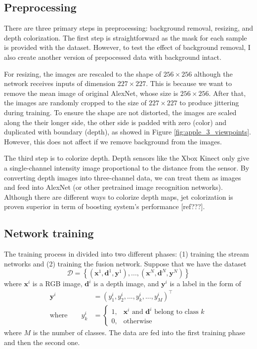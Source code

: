 \subsection{Preprocessing}\label{subsec:preprocessing}
There are three primary steps in preprocessing: background removal, resizing, and depth colorization. The first step is straightforward as the mask for each sample is provided with the dataset. However, to test the effect of background removal, I also create another version of prepocessed data with background intact. 

For resizing, the images are rescaled to the shape of $256 \times 256$ although the network receives inputs of dimension $227 \times 227$. This is because we want to remove the mean image of original AlexNet, whose size is $256 \times 256$. After that, the images are randomly cropped to the size of $227 \times 227$ to produce jittering during training. To ensure the shape are not distorted, the images are scaled along the their longer side, the other side is padded with zero (color) and duplicated with boundary (depth), as showed in Figure \ref{fig:apple_3_viewpoints}. However, this does not affect if we remove background from the images.

The third step is to colorize depth. Depth sensors like the Xbox Kinect only give a single-channel intensity image proportional to the distance from the sensor. By converting depth images into three-channel data, we can treat them as images and feed into AlexNet (or other pretrained image recognition networks). Although there are different ways to colorize depth maps, jet colorization is proven superior in term of boosting system’s performance [ref???].

\subsection{Network training}\label{sec:training}
The training process in divided into two different phases: (1) training the stream networks and (2) training the fusion network. Suppose that we have the dataset
\begin{equation}
	\mathcal{D} = \left\{ \left(\mathbf{x}^1, \mathbf{d}^1, \mathbf{y}^1\right), ..., \left(\mathbf{x}^N, \mathbf{d}^N, \mathbf{y}^N\right) \right\}
\end{equation}
where $\mathbf{x}^i$ is a RGB image, $\mathbf{d}^i$ is a depth image, and $\mathbf{y}^i$ is a label in the form of
\begin{align}
	\label{equ:label}
	\mathbf{y}^i &= (y_1^i, y_2^i, ..., y_k^i, ..., y_{M}^i)^\top \\
	\text{where} \qquad y_k^i &= 
	\begin{cases}
	1, & \mathbf{x}^i \text{ and } \mathbf{d}^i \text{ belong to class } k\\
	0, & \text{otherwise}
	\end{cases}
\end{align}
where $M$ is the number of classes. The data are fed into the first training phase and then the second one.

